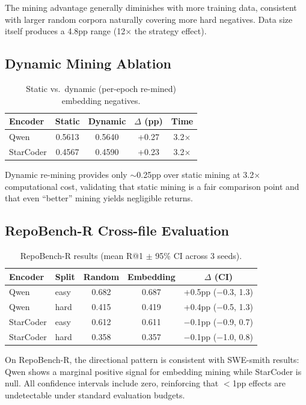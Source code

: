 \documentclass[11pt]{article}
\begin{document}
The mining advantage generally diminishes with more training data, consistent with larger random corpora naturally covering more hard negatives. Data size itself produces a 4.8pp range (12$\times$ the strategy effect).

\subsection{Dynamic Mining Ablation}

\begin{table}[h]
\centering
\caption{Static vs.\ dynamic (per-epoch re-mined) embedding negatives.}
\label{tab:dynamic}
\begin{tabular}{lcccc}
\toprule
Encoder & Static & Dynamic & $\Delta$ (pp) & Time \\
\midrule
Qwen & 0.5613 & 0.5640 & +0.27 & 3.2$\times$ \\
StarCoder & 0.4567 & 0.4590 & +0.23 & 3.2$\times$ \\
\bottomrule
\end{tabular}
\end{table}

Dynamic re-mining provides only $\sim$0.25pp over static mining at 3.2$\times$ computational cost, validating that static mining is a fair comparison point and that even ``better'' mining yields negligible returns.

\subsection{RepoBench-R Cross-file Evaluation}

\begin{table}[h]
\centering
\caption{RepoBench-R results (mean R@1 $\pm$ 95\% CI across 3 seeds).}
\label{tab:repobench}
\begin{tabular}{llccc}
\toprule
Encoder & Split & Random & Embedding & $\Delta$ (CI) \\
\midrule
Qwen & easy & 0.682 & 0.687 & +0.5pp ($-$0.3, 1.3) \\
Qwen & hard & 0.415 & 0.419 & +0.4pp ($-$0.5, 1.3) \\
StarCoder & easy & 0.612 & 0.611 & $-$0.1pp ($-$0.9, 0.7) \\
StarCoder & hard & 0.358 & 0.357 & $-$0.1pp ($-$1.0, 0.8) \\
\bottomrule
\end{tabular}
\end{table}

On RepoBench-R, the directional pattern is consistent with SWE-smith results: Qwen shows a marginal positive signal for embedding mining while StarCoder is null. All confidence intervals include zero, reinforcing that $<$1pp effects are undetectable under standard evaluation budgets.
\end{document}
